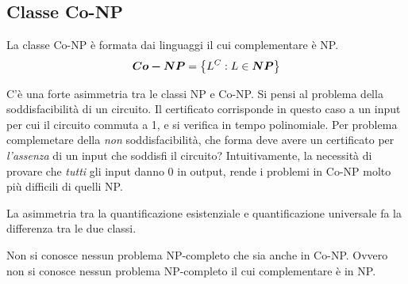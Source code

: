 \subsection{Classe Co-NP}
\begin{definition}[Classe Co-NP]
    \label{def:classeconp}
    La classe Co-NP è formata dai linguaggi il cui complementare è NP.
    \begin{equation*}
        \bm{Co-NP} = \left\{ L^C : L \in \bm{NP} \right\}
    \end{equation*}
\end{definition}
C'è una forte asimmetria tra le classi NP e Co-NP.
Si pensi al problema della soddisfacibilità di un circuito. Il certificato corrisponde in questo caso a un input per cui il circuito commuta a 1, e si verifica in tempo polinomiale.
Per problema complemetare della \emph{non} soddisfacibilità, che forma deve avere un certificato per \emph{l'assenza} di un input che soddisfi il circuito?
Intuitivamente, la necessità di provare che \emph{tutti} gli input danno 0 in output, rende i problemi in Co-NP molto più difficili di quelli NP.

La asimmetria tra la quantificazione esistenziale e quantificazione universale fa la differenza tra le due classi.

Non si conosce nessun problema NP-completo che sia anche in Co-NP.
Ovvero non si conosce nessun problema NP-completo il cui complementare è in NP.


